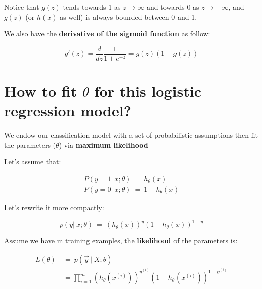 \documentclass{article}
\begin{document}
\begin{flushleft}
Notice that $g(z)$ tends towards 1 as $z\rightarrow\infty$ and towards 0 as $z\rightarrow-\infty$, and $g(z)$ (or $h(x)$ as well) is always bounded between 0 and 1.
\end{flushleft}

\begin{flushleft}
We also have the \textbf{derivative of the sigmoid function} as follow:
\end{flushleft}

\begin{equation}
    g'(z)=\frac{d}{dz}\frac{1}{1 + e^{-z}}=g(z)(1 - g(z))
\end{equation}

\section{How to fit $\theta$ for this logistic regression model?}

\begin{flushleft}
We endow our classification model with a set of probabilistic assumptions then fit the parameters ($\theta$) via \textbf{maximum likelihood}
\end{flushleft}

\begin{flushleft}
Let's assume that:
\end{flushleft}

\begin{equation}
\begin{split}
    P(y=1|\ x;\theta)\ =\ h_{\theta}(x) \\
    P(y=0|\ x;\theta)\ =\ 1 - h_{\theta}(x)
\end{split}
\end{equation}

\begin{flushleft}
Let's rewrite it more compactly:
\end{flushleft}

\begin{equation}
p(y|\ x;\theta)\ =\ (h_{\theta}(x))^{y}(1 - h_{\theta}(x))^{1-y}
\end{equation}

\begin{flushleft}
Assume we have m training examples, the \textbf{likelihood} of the parameters is:
\end{flushleft}

\begin{equation}
\begin{split}
L(\theta)\ &=\ p(\vec{y}\ |\ X;\theta) \\
           &= \prod_{i=1}^m (h_{\theta}(x^{(i)}))^{y^{(i)}}(1 - h_{\theta}(x^{(i)}))^{1-y^{(i)}}
\end{split}
\end{equation}
\end{document}
